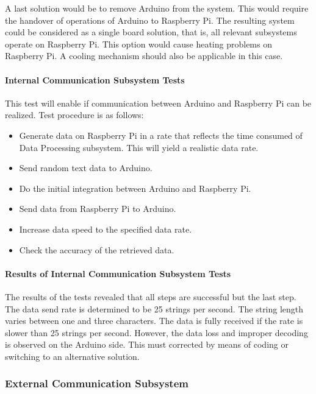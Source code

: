 \documentclass[a4paper,12pt]{article}
\begin{document}
		A last solution would be to remove Arduino from the system. This would require the handover of operations of Arduino to Raspberry Pi. The resulting system could be considered as a single board solution, that is, all relevant subsystems operate on Raspberry Pi. This option would cause heating problems on Raspberry Pi. A cooling mechanism should also be applicable in this case.
	\paragraph{Internal Communication Subsystem Tests}
	This test will enable if communication between Arduino and Raspberry Pi can be realized. Test procedure is as follows:
	\begin{itemize}
		\item Generate data on Raspberry Pi in a rate that reflects the time consumed of Data Processing subsystem. This will yield a realistic data rate. \vspace{-0.2cm}
		\item Send random text data to Arduino. \vspace{-0.2cm}
		\item Do the initial integration between Arduino and Raspberry Pi. \vspace{-0.2cm}
		\item Send data from Raspberry Pi to Arduino. \vspace{-0.2cm}
		\item Increase data speed to the specified data rate. \vspace{-0.2cm}
		\item Check the accuracy of the retrieved data.\vspace{-0.2cm}
	\end{itemize}
	
	\paragraph{Results of Internal Communication Subsystem Tests}
	The results of the tests revealed that all steps are successful but the last step. The data send rate is determined to be 25 strings per second. The string length varies between one and three characters. The data is fully received if the rate is slower than 25 strings per second. However, the data loss  and  improper decoding is observed on the Arduino side. This must corrected by means of coding or switching to an alternative solution.
	
	\subsubsection{External Communication Subsystem}
	
\end{document}
